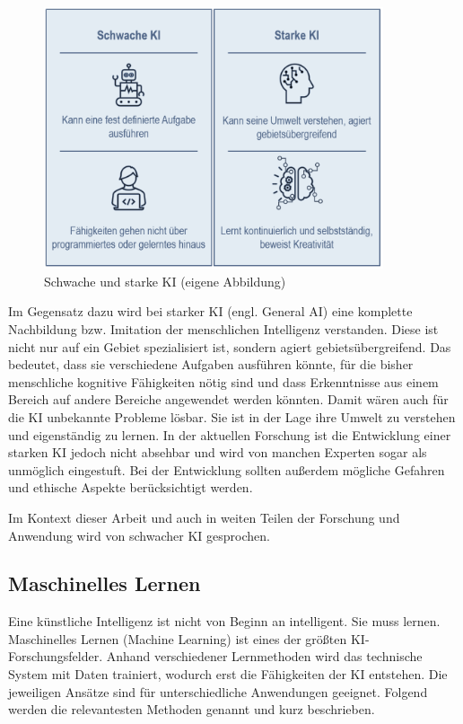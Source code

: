 \documentclass[a4paper,12pt, german]{report}
\begin{document}
\begin{figure}[H]
  \center
 \includegraphics[width=10cm]{images/starkeschwacheKI.png}
  \caption[Schwache und Starke KI]{Schwache und starke KI (eigene Abbildung)}
\end{figure}
Im Gegensatz dazu wird bei starker KI (engl. General AI) eine komplette Nachbildung bzw. Imitation der menschlichen Intelligenz verstanden. Diese ist nicht nur auf ein Gebiet spezialisiert ist, sondern agiert gebietsübergreifend. Das bedeutet, dass sie verschiedene Aufgaben ausführen könnte, für die bisher menschliche kognitive Fähigkeiten nötig sind und dass Erkenntnisse aus einem Bereich auf andere Bereiche angewendet werden könnten. Damit wären auch für die KI unbekannte Probleme lösbar. Sie ist in der Lage ihre Umwelt zu verstehen und eigenständig zu lernen. In der aktuellen Forschung ist die Entwicklung einer starken KI jedoch nicht absehbar und wird von manchen Experten sogar als unmöglich eingestuft. Bei der Entwicklung sollten außerdem mögliche Gefahren und ethische Aspekte berücksichtigt werden. 

Im Kontext dieser Arbeit und auch in weiten Teilen der Forschung und Anwendung wird von schwacher KI gesprochen. \cite{01}\cite{15}

\subsection{Maschinelles Lernen}

Eine künstliche Intelligenz ist nicht von Beginn an intelligent. Sie muss lernen. Maschinelles Lernen (Machine Learning) ist eines der größten KI-Forschungsfelder. Anhand verschiedener Lernmethoden wird das technische System mit Daten trainiert, wodurch erst die Fähigkeiten der KI entstehen. Die jeweiligen Ansätze sind für unterschiedliche Anwendungen geeignet. \newline
Folgend werden die relevantesten Methoden genannt und kurz beschrieben. \cite{10}
\end{document}
